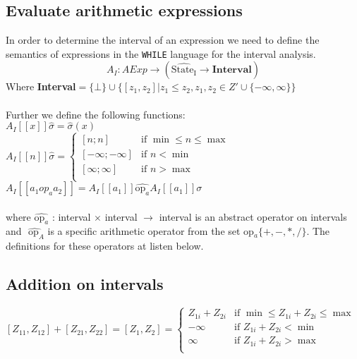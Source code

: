 \subsection{Evaluate arithmetic expressions}
In order to determine the interval of an expression we need to define the semantics of expressions in the \texttt{WHILE} language for the interval analysis.
\begin{equation}
A_I : AExp \rightarrow (\widehat{\text{State}_{\text{I}}} \rightarrow \textbf{Interval})
\end{equation}
Where  \textbf{Interval}$=\{\bot\}\cup\{[z_1,z_2]|z_1\leq z_2,z_1,z_2\in Z'\cup\{-\infty,\infty\}\}$
\\\\
Further we define the following functions:\\
$A_I[\![x]\!]\widehat{\sigma} = \widehat{\sigma}(x)$ \\
$A_I[\![n]\!]\widehat{\sigma} = 
     \begin{cases} 
        [n;n] & \text{if } \min \leq n \leq \max \\
        [-\infty;-\infty] & \text{if } n < \min\\
        [\infty;\infty] & \text{if } n > \max\\
     \end{cases}$\\
$A_I[\![a_1 op_a a_2 ]\!] = A_I[\![a_1]\!] \widehat{\text{op}_a} A_I[\![a_1]\!]\sigma $\\\\
where $\widehat{\text{op}_a}$ : interval $\times$ interval $\rightarrow$ interval is an abstract operator on intervals and $\widehat{\text{ op}_A}$ is a specific arithmetic operator from the set op$_a \{+,-,*,/\}$.
The definitions for these operators at listen below.

\subsection{Addition on intervals}
$[Z_{11},Z_{12}] + [Z_{21},Z_{22}] = [Z_{1},Z_{2}] =
     \begin{cases} 
        Z_{1i} + Z_{2i} & \text{if } \min \leq Z_{1i} + Z_{2i} \leq \max \\
        -\infty         & \text{if } Z_{1i} + Z_{2i} < \min \\
        \infty          & \text{if } Z_{1i} + Z_{2i} > \max\\
     \end{cases}
$

